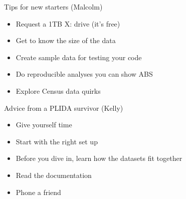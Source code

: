 \documentclass[aspectratio=169,12pt]{beamer} %
\begin{document}
\begin{frame}{Tips for new starters (Malcolm)}
\begin{itemize}
	\item Request a 1TB X: drive (it's free)
	\item Get to know the size of the data
	\item Create sample data for testing your code
	\item Do reproducible analyses you can show ABS
	\item Explore Census data quirks
\end{itemize}
\end{frame}

\begin{frame}{Advice from a PLIDA survivor (Kelly)}
\begin{itemize}
	\item Give yourself time
	\item Start with the right set up
	\item Before you dive in, learn how the datasets fit together
	\item Read the documentation
	\item Phone a friend
\end{itemize}
\end{frame}

%         
\end{document}

